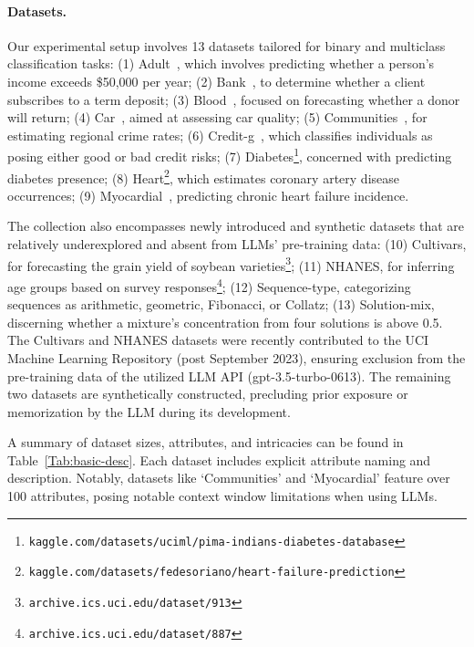 \paragraph{Datasets.}
Our experimental setup involves 13 datasets tailored for binary and multiclass classification tasks: (1) Adult~\cite{asuncion2007uci}, which involves predicting whether a person’s income exceeds \$50,000 per year; (2) Bank~\cite{moro2014data}, to determine whether a client subscribes to a term deposit; (3) Blood~\cite{yeh2009knowledge}, focused on forecasting whether a donor will return; (4) Car~\cite{kadra2021well}, aimed at assessing car quality; (5) Communities~\cite{misc_communities_and_crime_183}, for estimating regional crime rates; (6) Credit-g~\cite{kadra2021well}, which classifies individuals as posing either good or bad credit risks; (7) Diabetes\footnote{\texttt{kaggle.com/datasets/uciml/pima-indians-diabetes-database}}, concerned with predicting diabetes presence; (8) Heart\footnote{\texttt{kaggle.com/datasets/fedesoriano/heart-failure-prediction}}, which estimates coronary artery disease occurrences; (9) Myocardial~\cite{misc_myocardial_infarction_complications_579}, predicting chronic heart failure incidence.

The collection also encompasses newly introduced and synthetic datasets that are relatively underexplored and absent from LLMs’ pre-training data: (10) Cultivars, for forecasting the grain yield of soybean varieties\footnote{\texttt{archive.ics.uci.edu/dataset/913}}; (11) NHANES, for inferring age groups based on survey responses\footnote{\texttt{archive.ics.uci.edu/dataset/887}}; (12) Sequence-type, categorizing sequences as arithmetic, geometric, Fibonacci, or Collatz; (13) Solution-mix, discerning whether a mixture’s concentration from four solutions is above 0.5. The Cultivars and NHANES datasets were recently contributed to the UCI Machine Learning Repository (post September 2023), ensuring exclusion from the pre-training data of the utilized LLM API (gpt-3.5-turbo-0613). The remaining two datasets are synthetically constructed, precluding prior exposure or memorization by the LLM during its development.

A summary of dataset sizes, attributes, and intricacies can be found in Table~\ref{Tab:basic-desc}.
Each dataset includes explicit attribute naming and description. Notably, datasets like `Communities’ and `Myocardial’ feature over 100 attributes, posing notable context window limitations when using LLMs.

\vspace*{-0.12in}
